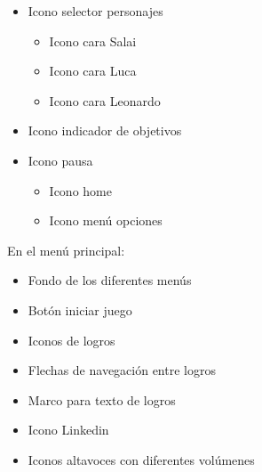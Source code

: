 \liststyleLFOxiii
\begin{itemize}
\item {
Icono selector personajes\ }

\begin{itemize}
\item {
Icono cara Salai}
\item {
Icono cara Luca}
\item {
Icono cara Leonardo}
\end{itemize}
\item {
Icono indicador de objetivos}
\item {
Icono pausa}

\begin{itemize}
\item {
Icono home}
\item {
Icono men\'u opciones}
\end{itemize}
\end{itemize}
{
En el men\'u principal:}

\liststyleLFOxiv
\begin{itemize}
\item {
Fondo de los diferentes men\'us}
\item {
Bot\'on iniciar juego}
\item {
Iconos de logros}
\item {
Flechas de navegaci\'on entre logros}
\item {
Marco para texto de logros}
\item {
Icono Linkedin}
\item {
Iconos altavoces con diferentes vol\'umenes}
\end{itemize}

\bigskip


\bigskip


\bigskip
%
